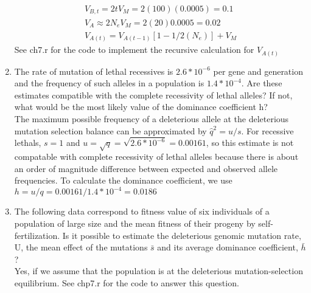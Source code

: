 \documentclass[12pt]{amsart}
\begin{document}
\begin{enumerate}
\begin{gather*}
V_{B,t} = 2tV_M = 2(100)(0.0005)=0.1\\
V_A\approx 2N_eV_M=2(20)0.0005=0.02\\
V_{A(t)} = V_{A(t-1)}[1-1/2(N_e)] + V_M
\end{gather*}
See ch7.r for the code to implement the recursive calculation for $V_{A(t)}$
\item The rate of mutation of lethal recessives is $2.6*10^{-6}$ per gene and generation and the frequency of such alleles in a population is $1.4*10^{-4}$. Are these estimates compatible with the complete recessivity of lethal alleles? If not, what would be the most likely value of the dominance coefficient h?\\
The maximum possible frequency of a deleterious allele at the deleterious mutation selection balance can be approximated by $\hat{q}^2 = u/s$. For recessive lethals, $s = 1$ and $u = \sqrt{q} = \sqrt{2.6*10^{-6}} = 0.00161$, so this estimate is not compatable with complete recessivity of lethal alleles because there is about an order of magnitude difference between expected and observed allele frequencies. To calculate the dominance coefficient, we use $h=u/q	= 0.00161/1.4*10^{-4} = 0.0186$
\item The following data correspond to fitness value of six individuals of a population of large size and the mean fitness of their progeny by self-fertilization. Is it possible to estimate the deleterious genomic mutation rate, U, the mean effect of the mutations $\bar{s}$ and its average dominance coefficient, $\bar{h}$? \\
Yes, if we assume that the population is at the deleterious mutation-selection equilibrium. See chp7.r for the code to answer this question.
\end{enumerate}
\end{document}
